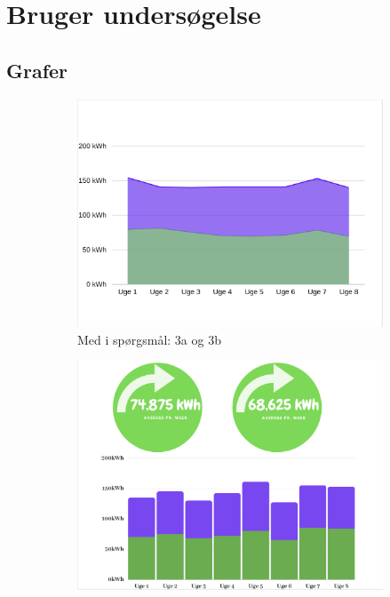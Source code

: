 \chapter{Bruger undersøgelse}
\label{appendix:survey}
\section{Grafer}
\begin{figure}[H]
    \centering
    \begin{subfigure}[b]{0.45\textwidth}
        \centering
        \includegraphics[width=\textwidth]{Images/appendixA/graph.png}
        \caption[Graf 1 til spørgeskema del 3]{Med i spørgsmål: 3a og 3b}
    \end{subfigure}
    \hfill
    \begin{subfigure}[b]{0.45\textwidth}
        \centering
        \includegraphics[width=\textwidth]{Images/appendixA/hist_wheel.png}

\end{subfigure}
\end{figure}
